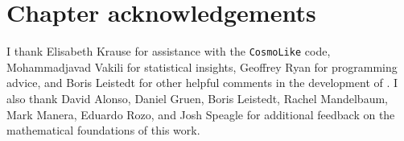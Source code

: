 
\section*{Chapter acknowledgements}

I thank Elisabeth Krause for assistance with the \texttt{CosmoLike} code, Mohammadjavad Vakili for statistical insights, Geoffrey Ryan for programming advice, and Boris Leistedt for other helpful comments in the development of \Chippr.
I also thank David Alonso, Daniel Gruen, Boris Leistedt, Rachel Mandelbaum, Mark Manera, Eduardo Rozo, and Josh Speagle for additional feedback on the mathematical foundations of this work.
